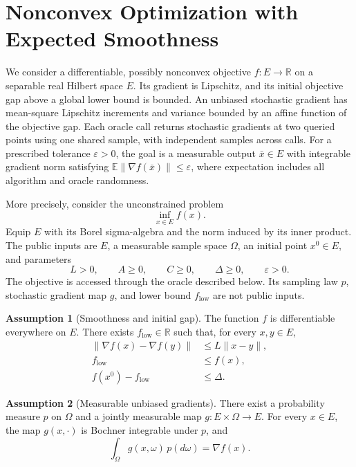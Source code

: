 \documentclass[10pt]{article}
\theoremstyle{definition}
\newtheorem{assumption}{Assumption}
\begin{document}
\section*{Nonconvex Optimization with Expected Smoothness}
We consider a differentiable, possibly nonconvex objective $f:E\to\mathbb{R}$ on a separable real Hilbert space $E$. Its gradient is Lipschitz, and its initial objective gap above a global lower bound is bounded. An unbiased stochastic gradient has mean-square Lipschitz increments and variance bounded by an affine function of the objective gap. Each oracle call returns stochastic gradients at two queried points using one shared sample, with independent samples across calls. For a prescribed tolerance $\varepsilon>0$, the goal is a measurable output $\bar{x}\in E$ with integrable gradient norm satisfying $\mathbb{E}\|\nabla f(\bar{x})\|\leq\varepsilon$, where expectation includes all algorithm and oracle randomness.

More precisely, consider the unconstrained problem
\[
\inf_{x\in E} f(x).
\]
Equip $E$ with its Borel sigma-algebra and the norm induced by its inner product. The public inputs are $E$, a measurable sample space $\Omega$, an initial point $x^0\in E$, and parameters
\[
L>0,\qquad A\geq 0,\qquad C\geq 0,\qquad
\Delta\geq 0,\qquad \varepsilon>0.
\]
The objective is accessed through the oracle described below. Its sampling law $p$, stochastic gradient map $g$, and lower bound $f_{\mathrm{low}}$ are not public inputs.

\begin{assumption}[Smoothness and initial gap]
The function $f$ is differentiable everywhere on $E$. There exists $f_{\mathrm{low}}\in\mathbb{R}$ such that, for every $x,y\in E$,
\[
\begin{aligned}
\|\nabla f(x)-\nabla f(y)\| &\leq L\|x-y\|,\\
f_{\mathrm{low}} &\leq f(x),\\
f(x^0)-f_{\mathrm{low}} &\leq \Delta.
\end{aligned}
\]
\end{assumption}

\begin{assumption}[Measurable unbiased gradients]
There exist a probability measure $p$ on $\Omega$ and a jointly measurable map $g:E\times\Omega\to E$. For every $x\in E$, the map $g(x,\cdot)$ is Bochner integrable under $p$, and
\[
\int_{\Omega} g(x,\omega)\,p(d\omega)=\nabla f(x).
\]
\end{assumption}
\end{document}
